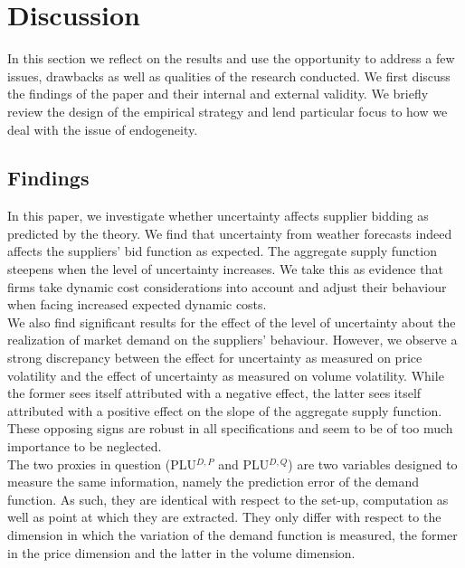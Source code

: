 \section{Discussion }
\label{discussgeneral}
\pagestyle{plain}
In this section we reflect on the results and use the opportunity to address a few issues, drawbacks as well as qualities of the research conducted. We first discuss the findings of the paper and their internal and external validity. We briefly review the design of the empirical strategy and lend particular focus to how we deal with the issue of endogeneity.

\subsection{Findings}\label{findings}
In this paper, we investigate whether uncertainty affects supplier bidding as predicted by the theory. 
We find that uncertainty from weather forecasts indeed affects the suppliers' bid function as expected. The aggregate supply function steepens when the level of uncertainty increases. We take this as evidence that firms take dynamic cost considerations into account and adjust their behaviour when facing increased expected dynamic costs. \\

We also find significant results for the effect of the level of uncertainty about the realization of market demand on the suppliers' behaviour. However, we observe a strong discrepancy between the effect for uncertainty as measured on price volatility and the effect of uncertainty as measured on volume volatility. While the former sees itself attributed with a negative effect, the latter sees itself attributed with a positive effect on the slope of the aggregate supply function. 
These opposing signs are robust in all specifications and seem to be of too much importance to be neglected. \\

The two proxies in question (PLU$^{D,P}$ and PLU$^{D,Q}$) are two variables designed to measure the same information, namely the prediction error of the demand function.
As such, they are identical with respect to the set-up, computation as well as point at which they are extracted. They only differ with respect to the dimension in which the variation of the demand function  is measured, the former in the price dimension and the latter in the volume dimension. \\

